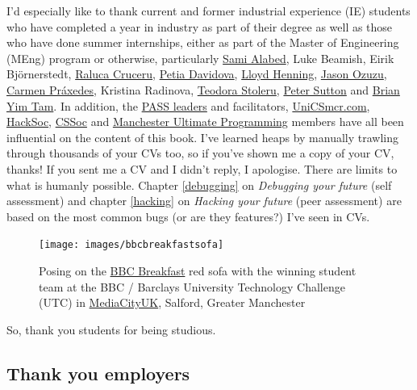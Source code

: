 \documentclass[
]{book}
\begin{document}
I'd especially like to thank current and former industrial experience (IE) students who have completed a year in industry as part of their degree as well as those who have done summer internships, either as part of the Master of Engineering (MEng) program or otherwise, particularly \href{https://github.com/samialabed}{Sami Alabed}, Luke Beamish, Eirik Björnerstedt, \href{https://www.cdyf.me/raluca.html}{Raluca Cruceru}, \href{https://www.youtube.com/channel/UCDmn8CxaXGxZSKq83vhzULw}{Petia Davidova}, \href{https://github.com/eldog}{Lloyd Henning}, \href{https://www.cdyf.me/jason.html}{Jason Ozuzu}, \href{https://www.cdyf.me/carmen.html}{Carmen Práxedes}, Kristina Radinova, \href{https://github.com/teostoleru}{Teodora Stoleru}, \href{https://github.com/dj-foxxy}{Peter Sutton} and \href{https://www.cdyf.me/brian.html}{Brian Yim Tam}. In addition, the \href{http://www.pass.manchester.ac.uk}{PASS leaders} and facilitators, \href{https://unicsmcr.com/}{UniCSmcr.com}, \href{https://github.com/unicsmcr/hacksoc.com}{HackSoc}, \href{https://github.com/cssoc}{CSSoc} and \href{https://github.com/Man-UP}{Manchester Ultimate Programming} members have all been influential on the content of this book. I've learned heaps by manually trawling through thousands of your CVs too, so if you've shown me a copy of your CV, thanks! If you sent me a CV and I didn't reply, I apologise. There are limits to what is humanly possible. Chapter \ref{debugging} on \emph{Debugging your future} (self assessment) and chapter \ref{hacking} on \emph{Hacking your future} (peer assessment) are based on the most common bugs (or are they features?) I've seen in CVs.

\begin{figure}

{\centering \texttt{[image: images/bbcbreakfastsofa]} 

}

\caption{Posing on the \href{https://en.wikipedia.org/wiki/BBC_Breakfast}{BBC Breakfast} red sofa with the winning student team at the BBC / Barclays University Technology Challenge (UTC) in \href{https://en.wikipedia.org/wiki/MediaCityUK}{MediaCityUK}, Salford, Greater Manchester}\label{fig:unnamed-chunk-3}
\end{figure}



So, thank you students for being studious. 🙏

\hypertarget{employers}{%
\subsection{Thank you employers}\label{employers}}
\end{document}

